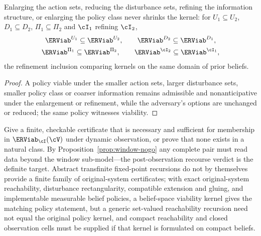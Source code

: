 \begin{proposition}\label{prop:monotone}
Enlarging the action sets, reducing the disturbance sets, refining the information structure, or enlarging the policy class never shrinks the kernel: for $U_1\subseteq U_2$, $D_1\subseteq D_2$, $\Pi_1\subseteq\Pi_2$ and $\cI_1$ refining $\cI_2$,
\[
\begin{gathered}
\ERViab^{U_1}\subseteq\ERViab^{U_2},\qquad \ERViab^{D_2}\subseteq\ERViab^{D_1},\\
\ERViab^{\Pi_1}\subseteq\ERViab^{\Pi_2},\qquad \ERViab^{\cI_2}\subseteq\ERViab^{\cI_1},
\end{gathered}
\]
the refinement inclusion comparing kernels on the same domain of prior beliefs.
\end{proposition}

\begin{proof}
A policy viable under the smaller action sets, larger disturbance sets, smaller policy class or coarser information remains admissible and nonanticipative under the enlargement or refinement, while the adversary's options are unchanged or reduced; the same policy witnesses viability.
\end{proof}

\begin{openproblem}\label{op:dynamic}
Give a finite, checkable certificate that is necessary and sufficient for membership in $\ERViab_\cI(\cV)$ under dynamic observation, or prove that none exists in a natural class. By Proposition~\ref{prop:window-nogo} any complete pair must read data beyond the window sub-model---the post-observation recourse verdict is the definite target. Abstract transfinite fixed-point recursions do not by themselves provide a finite family of original-system certificates; with exact original-system reachability, disturbance rectangularity, compatible extension and gluing, and implementable measurable belief policies, a belief-space viability kernel gives the matching policy statement, but a generic set-valued reachability recursion need not equal the original policy kernel, and compact reachability and closed observation cells must be supplied if that kernel is formulated on compact beliefs.
\end{openproblem}
